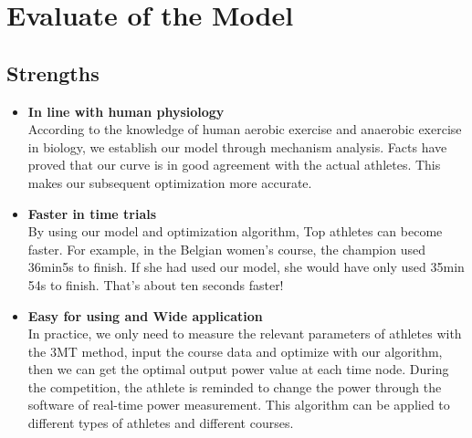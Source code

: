 \documentclass{mcmthesis}
\begin{document}


\section{Evaluate of the Model}


\subsection{Strengths}
\begin{itemize}
\item \textbf{In line with human physiology}\\
According to the knowledge of human aerobic exercise and anaerobic exercise in biology, we establish our model through mechanism analysis. Facts have proved that our curve is in good agreement with the actual athletes. This makes our subsequent optimization more accurate.
\item \textbf{Faster in time trials}\\
By using our model and optimization algorithm, Top athletes can become faster. For example, in the Belgian women's course, the champion used 36min5s to finish. If she had used our model, she would have only used 35min 54s to finish. That's about ten seconds faster! 
\item \textbf{Easy for using and Wide application}\\
In practice, we only need to measure the relevant parameters of athletes with the 3MT method, input the course data and optimize with our algorithm, then we can get the optimal output power value at each time node. During the competition, the athlete is reminded to change the power through the software of real-time power measurement. This algorithm can be applied to different types of athletes and different courses.
\end{itemize}
\end{document}
